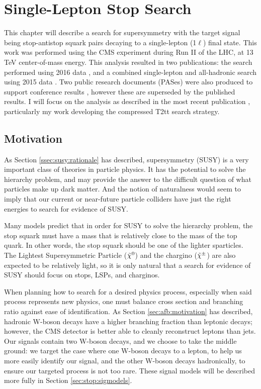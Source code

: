 \chapter{Single-Lepton Stop Search}
\label{chap:stop}

This chapter will describe a search for supersymmetry with the target signal
being stop-antistop squark pairs decaying to a single-lepton (1$\ell$)
final state. This work was performed using the CMS experiment during
Run II of the LHC, at 13 TeV center-of-mass energy. This analysis
resulted in two publications: the search performed using 2016 data \cite{stop1l},
and a combined single-lepton and all-hadronic search using 2015 data
\cite{combination0l}. Two public research documents (PASes) were
also produced to support conference results \cite{pasichep,pasmoriond},
however these are superseded by the published results. I will focus on
the analysis as described in the most recent publication
\cite{stop1l}, particularly my work developing the compressed T2tt
search strategy.

\section{Motivation}
\label{sec:stop:motivation}

As Section \ref{ssec:susy:rationale} has described, supersymmetry
(SUSY) is a very important class of theories in particle physics. It
has the potential to solve the hierarchy problem, and may provide the
answer to the difficult question of what particles make up dark
matter. And the notion of naturalness would seem to imply that our
current or near-future particle colliders have just the right energies
to search for evidence of SUSY.

Many models predict that in order for SUSY to solve the hierarchy
problem, the stop squark must have a mass that is relatively close to
the mass of the top quark. In other words, the stop squark should be
one of the lighter sparticles. The Lightest Supersymmetric Particle
($\tilde{\chi}^0$) and the chargino ($\tilde{\chi}^\pm$) are also expected to be
relatively light, so it is only natural that a search for evidence of
SUSY should focus on stops, LSPs, and charginos.

When planning how to search for a desired physics process, especially
when said process represents new physics,
one must balance cross section and branching ratio against
ease of identification. As Section \ref{sec:afb:motivation} has
described, hadronic W-boson decays have a higher branching fraction than
leptonic decays; however, the CMS detector is better able to cleanly
reconstruct leptons than jets. Our signals contain two W-boson decays,
and we choose to take the middle ground: we target the case where one
W-boson decays to a lepton, to help us more easily identify our signal, and
the other W-boson decays hadronically, to
ensure our targeted process is not too rare. These signal models will
be described more fully in Section \ref{sec:stop:sigmodels}.

